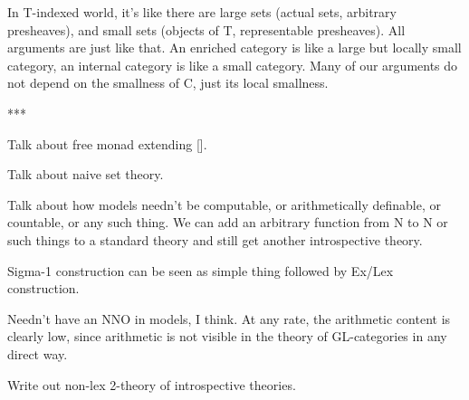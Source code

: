 In T-indexed world, it's like there are large sets (actual sets, arbitrary presheaves), and small sets (objects of T, representable presheaves). All arguments are just like that. An enriched category is like a large but locally small category, an internal category is like a small category. Many of our arguments do not depend on the smallness of C, just its local smallness.

***

Talk about free monad extending [].

Talk about naive set theory.

Talk about how models needn't be computable, or arithmetically definable, or countable, or any such thing. We can add an arbitrary function from N to N or such things to a standard theory and still get another introspective theory.

Sigma-1 construction can be seen as simple thing followed by Ex/Lex construction.

Needn't have an NNO in models, I think. At any rate, the arithmetic content is clearly low, since arithmetic is not visible in the theory of GL-categories in any direct way.

Write out non-lex 2-theory of introspective theories.